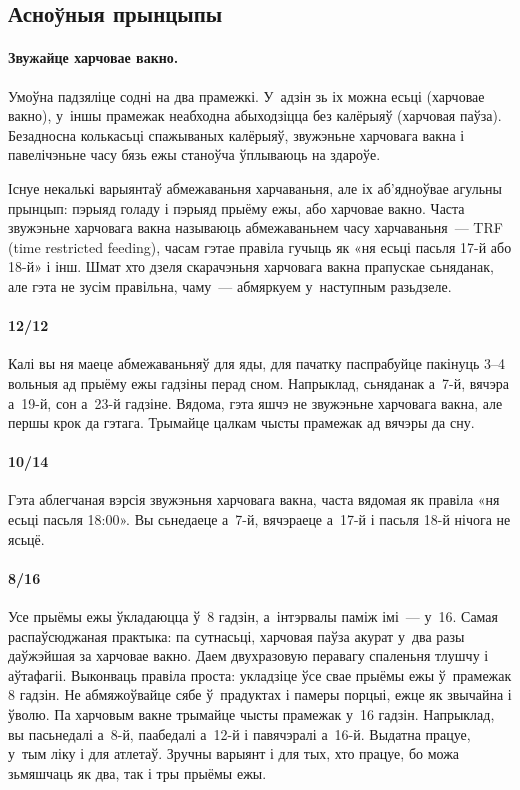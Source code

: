 \subsection{Асноўныя прынцыпы}

\paragraph{Звужайце харчовае вакно.}
Умоўна падзяліце содні на два прамежкі. У~адзін зь іх можна есьці (харчовае вакно), у~іншы прамежак неабходна абыходзіцца без калёрыяў (харчовая паўза). Безадносна колькасьці спажываных калёрыяў, звужэньне харчовага вакна і павелічэньне часу бязь ежы станоўча ўплываюць на здароўе.


Існуе некалькі варыянтаў абмежаваньня харчаваньня, але іх аб'ядноўвае агульны прынцып: пэрыяд голаду і пэрыяд прыёму ежы, або харчовае вакно. Часта звужэньне харчовага вакна называюць абмежаваньнем часу харчаваньня~--- TRF (time restricted feeding), часам гэтае правіла гучыць як «ня есьці пасьля 17-й або 18-й» і інш. Шмат хто дзеля скарачэньня харчовага вакна прапускае сьняданак, але гэта не зусім правільна, чаму~--- абмяркуем у~наступным разьдзеле.

\paragraph{12/12}
Калі вы ня маеце абмежаваньняў для яды, для пачатку паспрабуйце пакінуць 3--4 вольныя ад прыёму ежы гадзіны перад сном. Напрыклад, сьняданак а~7-й, вячэра а~19-й, сон а~23-й гадзіне. Вядома, гэта яшчэ не звужэньне харчовага вакна, але першы крок да гэтага. Трымайце цалкам чысты прамежак ад вячэры да сну.

\paragraph{10/14}
Гэта аблегчаная вэрсія звужэньня харчовага вакна, часта вядомая як правіла «ня есьці пасьля 18:00». Вы сьнедаеце а~7-й, вячэраеце а~17-й і пасьля 18-й нічога не ясьцё.

\paragraph{8/16}
Усе прыёмы ежы ўкладаюцца ў~8 гадзін, а~інтэрвалы паміж імі~--- у~16. Самая распаўсюджаная практыка: па сутнасьці, харчовая паўза акурат у~два разы даўжэйшая за харчовае вакно. Даем двухразовую перавагу спаленьня тлушчу і аўтафагіі. Выконваць правіла проста: укладзіце ўсе свае прыёмы ежы ў~прамежак 8 гадзін. Не абмяжоўвайце сябе ў~прадуктах і памеры порцыі, ежце як звычайна і ўволю. Па харчовым вакне трымайце чысты прамежак у~16 гадзін. Напрыклад, вы пасьнедалі а~8-й, паабедалі а~12-й і павячэралі а~16-й. Выдатна працуе, у~тым ліку і для атлетаў. Зручны варыянт і для тых, хто працуе, бо можа зьмяшчаць як два, так і тры прыёмы ежы.

